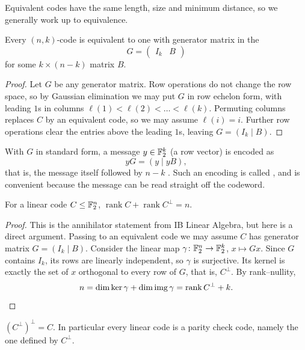 \documentclass[a4paper]{scrartcl}
\DeclareMathOperator{\rank}{rank}
\begin{document}
Equivalent codes have the same length, size and minimum distance, so we generally work up to equivalence.

\begin{lemma}\label{lem:standardform}
	Every $(n,k)$-code is equivalent to one with generator matrix in the 
	$$G = \begin{pmatrix} I_k & B\end{pmatrix}$$
	for some $k\times(n-k)$ matrix $B$.
\end{lemma}

\begin{proof}
	Let $G$ be any generator matrix. Row operations do not change the row space, so by Gaussian elimination we may put $G$ in row echelon form, with leading $1$s in columns $\ell(1)<\ell(2)<\dots<\ell(k)$. Permuting columns replaces $C$ by an equivalent code, so we may assume $\ell(i)=i$. Further row operations clear the entries above the leading $1$s, leaving $G = (I_k \mid B)$.
\end{proof}

With $G$ in standard form, a message $y \in \mathbb{F}_2^k$ (a row vector) is encoded as
$$yG = (y \mid yB),$$
that is, the message itself followed by $n-k$ . Such an encoding is called , and is convenient because the message can be read straight off the codeword.

\begin{lemma}\label{lem:dualdim}
	For a linear code $C \le \mathbb{F}_2^n$, $\rank C + \rank C^\perp = n$.
\end{lemma}

\begin{proof}
	This is the annihilator statement from IB Linear Algebra, but here is a direct argument. Passing to an equivalent code we may assume $C$ has generator matrix $G = (I_k \mid B)$. Consider the linear map $\gamma\colon \mathbb{F}_2^n \to \mathbb{F}_2^k$, $x \mapsto Gx$. Since $G$ contains $I_k$, its rows are linearly independent, so $\gamma$ is surjective. Its kernel is exactly the set of $x$ orthogonal to every row of $G$, that is, $C^\perp$. By rank--nullity,
	$$n = \dim\ker\gamma + \dim\image\gamma = \rank C^\perp + k. \qedhere$$
\end{proof}

\begin{corollary}
	$(C^\perp)^\perp = C$. In particular every linear code is a parity check code, namely the one defined by $C^\perp$.
\end{corollary}
\end{document}
